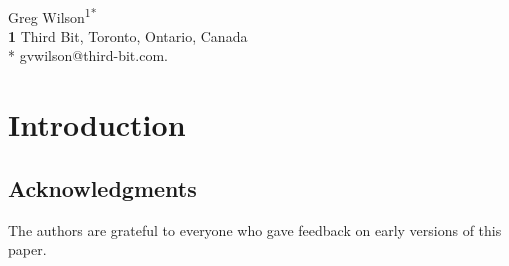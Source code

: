 \documentclass[10pt,letterpaper]{article}
\begin{document}
\vspace*{0.2in}

\begin{flushleft}
{\Large
\textbf{}
}
\newline
\\
{Greg Wilson}\textsuperscript{1*}
\\
\bigskip
\textbf{1} Third Bit, Toronto, Ontario, Canada\\
* gvwilson@third-bit.com. \\
\end{flushleft}

\section*{Introduction}

\cite{Wilson2019}

\subsection*{Acknowledgments}

The authors are grateful to everyone who gave feedback on early versions of this paper.



\end{document}
